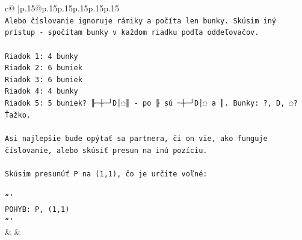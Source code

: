 \documentclass{article}
\begin{document}
{\begin{supertabular}{c@{$\;$}|p{.15\linewidth}@{}p{.15\linewidth}p{.15\linewidth}p{.15\linewidth}p{.15\linewidth}p{.15\linewidth}}
{{{\\ 
\texttt{Alebo číslovanie ignoruje rámiky a počíta len bunky. Skúsim iný prístup {-} spočítam bunky v každom riadku podľa oddeľovačov.} \\
\\ 
\texttt{Riadok 1: 4 bunky} \\
\texttt{Riadok 2: 6 buniek} \\
\texttt{Riadok 3: 6 buniek} \\
\texttt{Riadok 4: 4 bunky} \\
\texttt{Riadok 5: 5 buniek? ╟─┼─┘D│◌║ {-} po ╟ sú ─┼─┘D│◌ a ║. Bunky: ?, D, ◌? Ťažko.} \\
\\ 
\texttt{Asi najlepšie bude opýtať sa partnera, či on vie, ako funguje číslovanie, alebo skúsiť presun na inú pozíciu.} \\
\\ 
\texttt{Skúsim presunúť P na (1,1), čo je určite voľné:} \\
\\ 
\texttt{```} \\
\texttt{POHYB: P, (1,1)} \\
\texttt{```} \\
            }
        }
    }
    & & \\ \\


\end{supertabular}}
\end{document}
